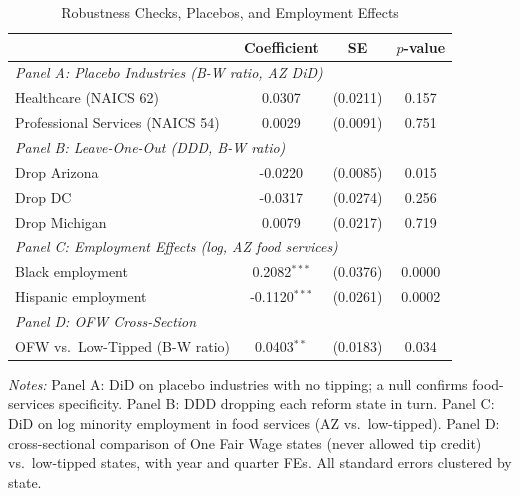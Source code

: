 \begin{table}[htbp]
\centering
\caption{Robustness Checks, Placebos, and Employment Effects}
\label{tab:robustness}
\begin{threeparttable}
\begin{tabular}{lccc}
\toprule
 & Coefficient & SE & $p$-value \\
\midrule
\multicolumn{4}{l}{\textit{Panel A: Placebo Industries (B-W ratio, AZ DiD)}} \\
\quad Healthcare (NAICS 62) & 0.0307 & (0.0211) & 0.157 \\
\quad Professional Services (NAICS 54) & 0.0029 & (0.0091) & 0.751 \\
\midrule
\multicolumn{4}{l}{\textit{Panel B: Leave-One-Out (DDD, B-W ratio)}} \\
\quad Drop Arizona & -0.0220 & (0.0085) & 0.015 \\
\quad Drop DC & -0.0317 & (0.0274) & 0.256 \\
\quad Drop Michigan & 0.0079 & (0.0217) & 0.719 \\
\midrule
\multicolumn{4}{l}{\textit{Panel C: Employment Effects (log, AZ food services)}} \\
\quad Black employment & 0.2082$^{***}$ & (0.0376) & 0.0000 \\
\quad Hispanic employment & -0.1120$^{***}$ & (0.0261) & 0.0002 \\
\midrule
\multicolumn{4}{l}{\textit{Panel D: OFW Cross-Section}} \\
\quad OFW vs.\ Low-Tipped (B-W ratio) & 0.0403$^{**}$ & (0.0183) & 0.034 \\
\bottomrule
\end{tabular}
\begin{tablenotes}[flushleft]\footnotesize
\item \textit{Notes:} Panel A: DiD on placebo industries with no tipping; a null confirms food-services specificity. Panel B: DDD dropping each reform state in turn. Panel C: DiD on log minority employment in food services (AZ vs.\ low-tipped). Panel D: cross-sectional comparison of One Fair Wage states (never allowed tip credit) vs.\ low-tipped states, with year and quarter FEs. All standard errors clustered by state.
\end{tablenotes}
\end{threeparttable}
\end{table}
